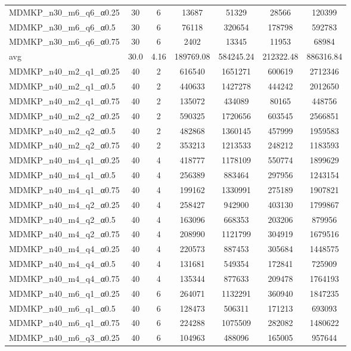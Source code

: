 \begin{table}[!ht]
\begin{tabular}{lcccccc}
MDMKP\_n30\_m6\_q6\_α0.25 & 30 & 6 & 13687 & 51329 & 28566 & 120399 \\
MDMKP\_n30\_m6\_q6\_α0.5 & 30 & 6 & 76118 & 320654 & 178798 & 592783 \\
MDMKP\_n30\_m6\_q6\_α0.75 & 30 & 6 & 2402 & 13345 & 11953 & 68984 \\
\cline{1-9} avg & 30.0 & 4.16 & 189769.08& 584245.24 & 212322.48& 886316.84\\ \hline
MDMKP\_n40\_m2\_q1\_α0.25 & 40 & 2 & 616540 & 1651271 & 600619 & 2712346 \\
MDMKP\_n40\_m2\_q1\_α0.5 & 40 & 2 & 440633 & 1427278 & 444242 & 2012650 \\
MDMKP\_n40\_m2\_q1\_α0.75 & 40 & 2 & 135072 & 434089 & 80165 & 448756 \\
MDMKP\_n40\_m2\_q2\_α0.25 & 40 & 2 & 590325 & 1720656 & 603545 & 2566851 \\
MDMKP\_n40\_m2\_q2\_α0.5 & 40 & 2 & 482868 & 1360145 & 457999 & 1959583 \\
MDMKP\_n40\_m2\_q2\_α0.75 & 40 & 2 & 353213 & 1213533 & 248212 & 1183593 \\
MDMKP\_n40\_m4\_q1\_α0.25 & 40 & 4 & 418777 & 1178109 & 550774 & 1899629 \\
MDMKP\_n40\_m4\_q1\_α0.5 & 40 & 4 & 256389 & 883464 & 297956 & 1243154 \\
MDMKP\_n40\_m4\_q1\_α0.75 & 40 & 4 & 199162 & 1330991 & 275189 & 1907821 \\
MDMKP\_n40\_m4\_q2\_α0.25 & 40 & 4 & 258427 & 942900 & 403130 & 1799867 \\
MDMKP\_n40\_m4\_q2\_α0.5 & 40 & 4 & 163096 & 668353 & 203206 & 879956 \\
MDMKP\_n40\_m4\_q2\_α0.75 & 40 & 4 & 208990 & 1121799 & 304919 & 1679516 \\
MDMKP\_n40\_m4\_q4\_α0.25 & 40 & 4 & 220573 & 887453 & 305684 & 1448575 \\
MDMKP\_n40\_m4\_q4\_α0.5 & 40 & 4 & 131681 & 549354 & 172841 & 725909 \\
MDMKP\_n40\_m4\_q4\_α0.75 & 40 & 4 & 135344 & 877633 & 209478 & 1764193 \\
MDMKP\_n40\_m6\_q1\_α0.25 & 40 & 6 & 264071 & 1132291 & 360940 & 1847235 \\
MDMKP\_n40\_m6\_q1\_α0.5 & 40 & 6 & 128473 & 506311 & 171213 & 693093 \\
MDMKP\_n40\_m6\_q1\_α0.75 & 40 & 6 & 224288 & 1075509 & 282082 & 1480622 \\
MDMKP\_n40\_m6\_q3\_α0.25 & 40 & 6 & 104963 & 488096 & 165005 & 957644 \\

\end{tabular}
\end{table}
